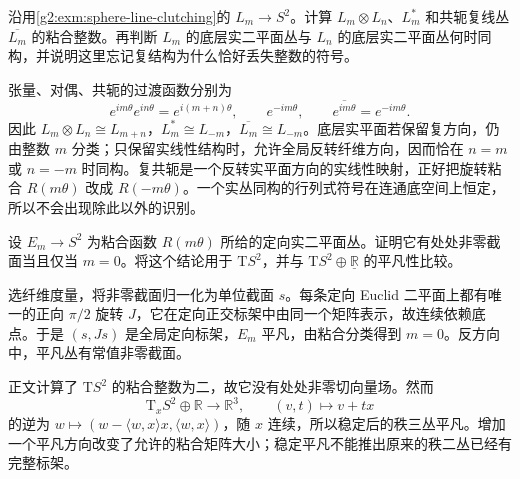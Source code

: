 \begin{exercise}\label{g2:ex:sphere-line-tensor-dual}
	沿用\cref{g2:exm:sphere-line-clutching}的 \(L_m\to S^2\)。计算 \(L_m\otimes L_n\)、\(L_m^*\) 和共轭复线丛 \(\overline{L_m}\) 的粘合整数。再判断 \(L_m\) 的底层实二平面丛与 \(L_n\) 的底层实二平面丛何时同构，并说明这里忘记复结构为什么恰好丢失整数的符号。
\end{exercise}
\begin{solution}
	张量、对偶、共轭的过渡函数分别为
	\[
		e^{im\theta}e^{in\theta}=e^{i(m+n)\theta},\qquad
		e^{-im\theta},\qquad \overline{e^{im\theta}}=e^{-im\theta}.
	\]
	因此 \(L_m\otimes L_n\cong L_{m+n}\)，\(L_m^*\cong L_{-m}\)，\(\overline{L_m}\cong L_{-m}\)。底层实平面若保留复方向，仍由整数 \(m\) 分类；只保留实线性结构时，允许全局反转纤维方向，因而恰在 \(n=m\) 或 \(n=-m\) 时同构。复共轭是一个反转实平面方向的实线性映射，正好把旋转粘合 \(R(m\theta)\) 改成 \(R(-m\theta)\)。一个实丛同构的行列式符号在连通底空间上恒定，所以不会出现除此以外的识别。
\end{solution}

\begin{exercise}\label{g2:ex:nonzero-section-oriented-plane-sphere}
	设 \(E_m\to S^2\) 为粘合函数 \(R(m\theta)\) 所给的定向实二平面丛。证明它有处处非零截面当且仅当 \(m=0\)。将这个结论用于 \(\mathrm TS^2\)，并与 \(\mathrm TS^2\oplus\underline{\mathbb R}\) 的平凡性比较。
\end{exercise}
\begin{solution}
	选纤维度量，将非零截面归一化为单位截面 \(s\)。每条定向 Euclid 二平面上都有唯一的正向 \(\pi/2\) 旋转 \(J\)，它在定向正交标架中由同一个矩阵表示，故连续依赖底点。于是 \((s,Js)\) 是全局定向标架，\(E_m\) 平凡，由粘合分类得到 \(m=0\)。反方向中，平凡丛有常值非零截面。

	正文计算了 \(\mathrm TS^2\) 的粘合整数为二，故它没有处处非零切向量场。然而
	\[
		\mathrm T_xS^2\oplus\mathbb R\longrightarrow\mathbb R^3,
		\qquad(v,t)\longmapsto v+tx
	\]
	的逆为 \(w\mapsto(w-\langle w,x\rangle x,\langle w,x\rangle)\)，随 \(x\) 连续，所以稳定后的秩三丛平凡。增加一个平凡方向改变了允许的粘合矩阵大小；稳定平凡不能推出原来的秩二丛已经有完整标架。
\end{solution}

